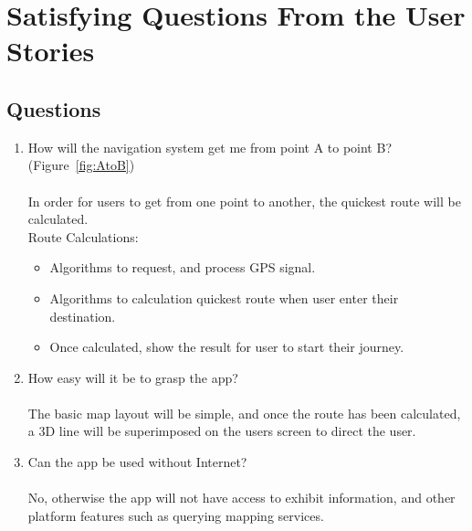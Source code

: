 \newpage

\section{Satisfying Questions From the User Stories}
\subsection*{Questions}
\begin{enumerate}
    \item How will the navigation system get me from point A to point B? (Figure~\ref{fig:AtoB})\\\\
    In order for users to get from one point to another, the quickest route will be calculated.\\
    Route Calculations:
    \begin{itemize}
        \item Algorithms to request, and process GPS signal.
        \item Algorithms to calculation quickest route when user enter their destination.
        \item Once calculated, show the result for user to start their journey.
    \end{itemize}
    
    \item How easy will it be to grasp the app?\\\\
    The basic map layout will be simple, and once the route has been calculated, a 3D line will be superimposed on the users screen to direct the user.
    
    \item Can the app be used without Internet? \\\\
    No, otherwise the app will not have access to exhibit information, and other platform features such as querying mapping services.

\end{enumerate}